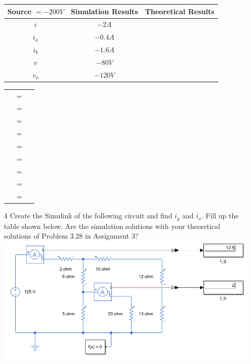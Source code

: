 \documentclass[a4paper]{article}
\begin{document}
\begin{itemize}
	      \begin{tabular}{|c|c|c|}
	      	\hline
	      	Source $= -200 V$ & Simulation Results & Theoretical Results \\
	      	\hline
	      	$i$               & $-2A$              &                     \\
	      	\hline
	      	$i_{a}$           & $-0.4A$            &                     \\
	      	\hline
	      	$i_{b}$           & $-1.6A$            &                     \\
	      	\hline
	      	$v$               & $-80V$             &                     \\
	      	\hline
	      	$v_{o}$           & $-120V$            &                     \\
	      	\hline
          \end{tabular} 
          \begin{tabular}{rcl}
            & $=$ &   \\
            & $=$ &   \\
            & $=$ &   \\
            & $=$ &   \\
            & $=$ &   \\
            & $=$ &   \\
            & $=$ &   \\
            & $=$ &   \\
            & $=$ &   \\
      \end{tabular}
	\item[4] Create the Simulink of the following circuit and find $i_{g}$ and $i_{o}$. Fill up the table shown below. Are the simulation solutions with your theoretical solutions of Problem 3.28 in Assignment 3? 
	      \includegraphics[scale=0.5]{circuit-2.png} \\

\end{itemize}
\end{document}
